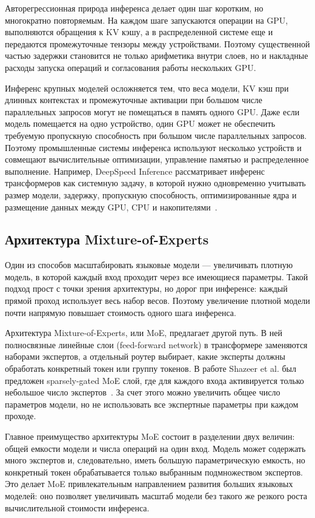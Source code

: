 Авторегрессионная природа инференса делает один шаг коротким, но многократно повторяемым. На каждом шаге запускаются операции на GPU, выполняются обращения к KV кэшу, а в распределенной системе еще и передаются промежуточные тензоры между устройствами. Поэтому существенной частью задержки становится не только арифметика внутри слоев, но и накладные расходы запуска операций и согласования работы нескольких GPU.

Инференс крупных моделей осложняется тем, что веса модели, KV кэш при длинных контекстах и промежуточные активации при большом числе параллельных запросов могут не помещаться в память одного GPU. Даже если модель помещается на одно устройство, один GPU может не обеспечить требуемую пропускную способность при большом числе параллельных запросов. Поэтому промышленные системы инференса используют несколько устройств и совмещают вычислительные оптимизации, управление памятью и распределенное выполнение. Например, DeepSpeed Inference рассматривает инференс трансформеров как системную задачу, в которой нужно одновременно учитывать размер модели, задержку, пропускную способность, оптимизированные ядра и размещение данных между GPU, CPU и накопителями~\cite{aminabadi2022deepspeed}.

\subsection{Архитектура Mixture-of-Experts}

Один из способов масштабировать языковые модели --- увеличивать плотную модель, в которой каждый вход проходит через все имеющиеся параметры. Такой подход прост с точки зрения архитектуры, но дорог при инференсе: каждый прямой проход использует весь набор весов. Поэтому увеличение плотной модели почти напрямую повышает стоимость одного шага инференса.

Архитектура Mixture-of-Experts, или MoE, предлагает другой путь. В ней полносвязные линейные слои (feed-forward network) в трансформере заменяются наборами экспертов, а отдельный роутер выбирает, какие эксперты должны обработать конкретный токен или группу токенов. В работе Shazeer et al. был предложен sparsely-gated MoE слой, где для каждого входа активируется только небольшое число экспертов~\cite{shazeer2017moe}. За счет этого можно увеличить общее число параметров модели, но не использовать все экспертные параметры при каждом проходе.

Главное преимущество архитектуры MoE состоит в разделении двух величин: общей емкости модели и числа операций на один вход. Модель может содержать много экспертов и, следовательно, иметь большую параметрическую емкость, но конкретный токен обрабатывается только выбранным подмножеством экспертов. Это делает MoE привлекательным направлением развития больших языковых моделей: оно позволяет увеличивать масштаб модели без такого же резкого роста вычислительной стоимости инференса.

